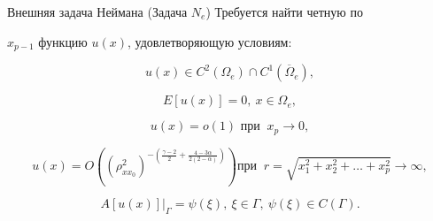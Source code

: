 \begin{newthm}


{Внешняя задача Неймана (Задача $N_e $)} Требуется найти четную по


$x_{p - 1} $ функцию $u(x)$,  удовлетворяющую условиям{\rm:}


\begin{equation}


\label{chebotareva:eq40} u(x) \in C^2\left( {\Omega _e } \right)


\cap C^1\left( {\overline \Omega _e } \right), 


\end{equation}


\begin{equation}


\label{chebotareva:eq41} E\left[ {u(x)} \right] = 0,  ~ x \in


\Omega _e , 


\end{equation}


\begin{equation}


\label{chebotareva:eq42} u\left( x \right) = o\left( 1 \right)


\text{ при } ~ x_p \to 0, 


\end{equation}


\begin{equation}


\label{chebotareva:eq43} u\left( x \right) = O\left( {\left( {\rho


_{xx_0 }^2 } \right)^{ - \left( {\frac{\gamma - 2}{2} + \frac{4 -


3\alpha }{2\left( {2 - \alpha } \right)}} \right)}} \right)\text{


при } ~ r = \sqrt {x_1^2 + x_2^2 + \dots + x_p^2 } \to \infty , 


\end{equation}


\begin{equation}


\label{chebotareva:eq44} A\left[ {u\left( x \right)} \right]\big|


_\Gamma = \psi (\xi ),  ~ \xi \in \Gamma ,  ~ \psi (\xi )


\in C\left( \Gamma \right).


\end{equation}


\end{newthm}


